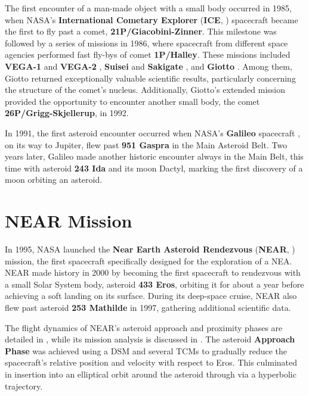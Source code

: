 \documentclass{Configuration_gigi/PoliMi3i_thesis}
\begin{document}
The first encounter of a man-made object with a small body occurred in 1985, when NASA's \textbf{International Cometary Explorer} (\textbf{ICE}, \cite{ice}) spacecraft became the first to fly past a comet, \textbf{21P/Giacobini-Zinner}. This milestone was followed by a series of missions in 1986, where spacecraft from different space agencies performed fast fly-bys of comet \textbf{1P/Halley}. These missions included \textbf{VEGA-1} and \textbf{VEGA-2} \cite{vega}, \textbf{Suisei} and \textbf{Sakigate} \cite{SuiseiSakigate}, and \textbf{Giotto} \cite{giotto}. Among them, Giotto returned exceptionally valuable scientific results, particularly concerning the structure of the comet’s nucleus. Additionally, Giotto's extended mission provided the opportunity to encounter another small body, the comet \textbf{26P/Grigg-Skjellerup}, in 1992. 

In 1991, the first asteroid encounter occurred when NASA's \textbf{Galileo} spacecraft \cite{galileo}, on its way to Jupiter, flew past \textbf{951 Gaspra} in the Main Asteroid Belt. Two years later, Galileo made another historic encounter always in the Main Belt, this time with asteroid \textbf{243 Ida} and its moon Dactyl, marking the first discovery of a moon orbiting an asteroid.


\section{NEAR Mission}\label{Sec:NEAR Mission}

In 1995, NASA launched the \textbf{Near Earth Asteroid Rendezvous} (\textbf{NEAR}, \cite{near}) mission, the first spacecraft specifically designed for the exploration of a NEA. NEAR made history in 2000 by becoming the first spacecraft to rendezvous with a small Solar System body, asteroid \textbf{433 Eros}, orbiting it for about a year before achieving a soft landing on its surface. During its deep-space cruise, NEAR also flew past asteroid \textbf{253 Mathilde} in 1997, gathering additional scientific data.

The flight dynamics of NEAR's asteroid approach and proximity phases are detailed in \cite{near}, while its mission analysis is discussed in \cite{nearMA}. The asteroid \textbf{Approach Phase} was achieved using a DSM and several TCMs to gradually reduce the spacecraft’s relative position and velocity with respect to Eros. This culminated in insertion into an elliptical orbit around the asteroid through via a hyperbolic trajectory. 
\end{document}
